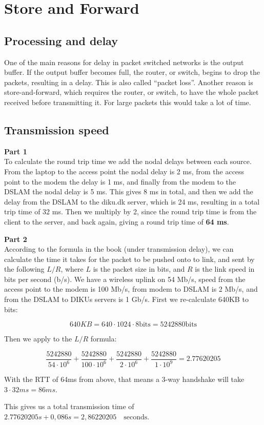 \section{Store and Forward}
\subsection{Processing and delay}
One of the main reasons for delay in packet switched networks is the output
buffer. If the output buffer becomes full, the router, or switch, begins to drop
the packets, resulting in a delay. This is also called ``packet loss''. Another
reason is store-and-forward, which requires the router, or switch, to have the
whole packet received before transmitting it. For large packets this would take
a lot of time.

\subsection{Transmission speed}
\textbf{Part 1}\\
To calculate the round trip time we add the nodal delays between each source.
From the laptop to the access point the nodal delay is 2 ms, from the access
point to the modem the delay is 1 ms, and finally from the modem to the DSLAM
the nodal delay is 5 ms. This gives 8 ms in total, and then we add the delay from the
DSLAM to the diku.dk server, which is 24 ms, resulting in a total trip time of
32 ms. Then we multiply by 2, since the round trip time is from the client to
the server, and back again, giving a round trip time of \textbf{64 ms}.

\noindent \textbf{Part 2}\\
According to the formula in the book (under transmission delay), we can
calculate the time it takes for the packet to be pushed onto to link, and sent
by the following $L/R$, where $L$ is the packet size in bits, and $R$ is the
link speed in bits per second (b/s). We have a wireless uplink on 54 Mb/s, speed
from the access point to the modem is 100 Mb/s, from modem to DSLAM is 2 Mb/s,
and from the DSLAM to DIKUs servers is 1 Gb/s. First we re-calculate 640KB to bits:

\[
	640KB = 640 \cdot 1024 \cdot 8 \text{bits} = 5242880 \text{bits}
\]

Then we apply to the $L/R$ formula:

\[
\frac{5242880}{54 \cdot 10^6} + \frac{5242880}{100 \cdot 10^6} +
\frac{5242880}{2 \cdot 10^6} + \frac{5242880}{1 \cdot 10^9} = 2.77620205
\]

With the RTT of 64ms from above, that means a 3-way handshake will take $3 \cdot 32ms = 86ms$.

This gives us a total transmission time of $2.77620205s + 0,086s = 2,86220205 \quad \text{seconds}$.
